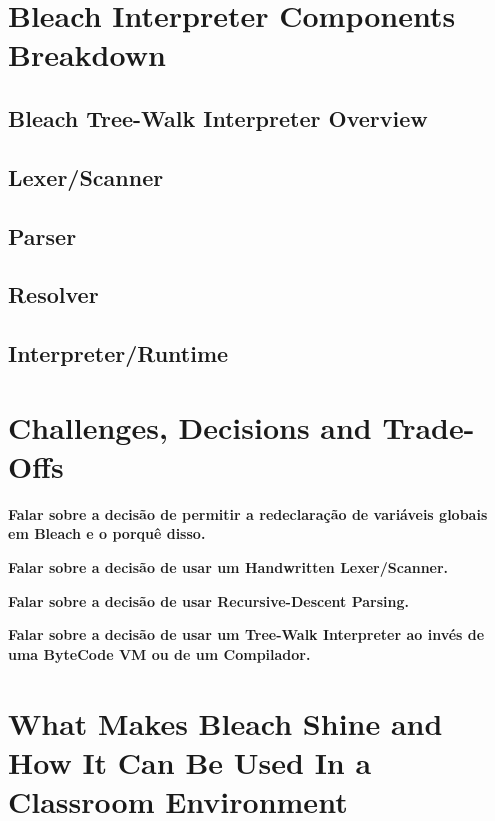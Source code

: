 \section{Bleach Interpreter Components Breakdown}

\subsection{Bleach Tree-Walk Interpreter Overview}
\subsection{Lexer/Scanner}
\subsection{Parser}
\subsection{Resolver}
\subsection{Interpreter/Runtime}

\section{Challenges, Decisions and Trade-Offs}
\textbf{Falar sobre a decisão de permitir a redeclaração de variáveis globais em Bleach e o porquê disso.}

\textbf{Falar sobre a decisão de usar um Handwritten Lexer/Scanner.}

\textbf{Falar sobre a decisão de usar Recursive-Descent Parsing.}

\textbf{Falar sobre a decisão de usar um Tree-Walk Interpreter ao invés de uma ByteCode VM ou de um Compilador.}


\section{What Makes Bleach Shine and How It Can Be Used In a Classroom Environment}